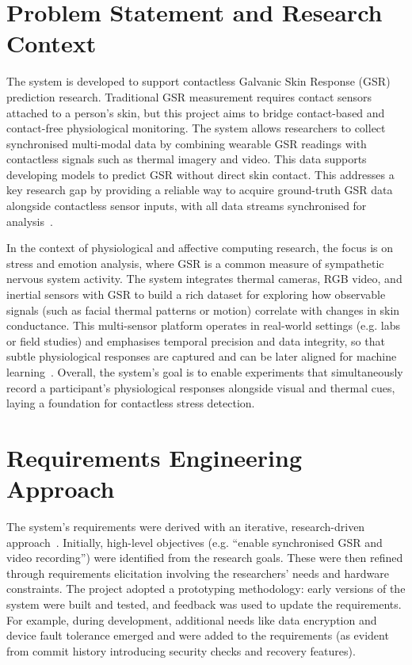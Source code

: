 \section{Problem Statement and Research Context}

The system is developed to support contactless Galvanic Skin Response (GSR) prediction research. Traditional GSR measurement requires contact sensors attached to a person's skin, but this project aims to bridge contact-based and contact-free physiological monitoring. The system allows researchers to collect synchronised multi-modal data by combining wearable GSR readings with contactless signals such as thermal imagery and video. This data supports developing models to predict GSR without direct skin contact. This addresses a key research gap by providing a reliable way to acquire ground-truth GSR data alongside contactless sensor inputs, with all data streams synchronised for analysis~\cite{boucsein2012electrodermal}.

In the context of physiological and affective computing research, the focus is on stress and emotion analysis, where GSR is a common measure of sympathetic nervous system activity. The system integrates thermal cameras, RGB video, and inertial sensors with GSR to build a rich dataset for exploring how observable signals (such as facial thermal patterns or motion) correlate with changes in skin conductance. This multi-sensor platform operates in real-world settings (e.g. labs or field studies) and emphasises temporal precision and data integrity, so that subtle physiological responses are captured and can be later aligned for machine learning~\cite{boucsein2012electrodermal}. Overall, the system's goal is to enable experiments that simultaneously record a participant's physiological responses alongside visual and thermal cues, laying a foundation for contactless stress detection.

\section{Requirements Engineering Approach}

The system's requirements were derived with an iterative, research-driven approach~\cite{selye1956stress}. Initially, high-level objectives (e.g. ``enable synchronised GSR and video recording'') were identified from the research goals. These were then refined through requirements elicitation involving the researchers' needs and hardware constraints. The project adopted a prototyping methodology: early versions of the system were built and tested, and feedback was used to update the requirements. For example, during development, additional needs like data encryption and device fault tolerance emerged and were added to the requirements (as evident from commit history introducing security checks and recovery features).

